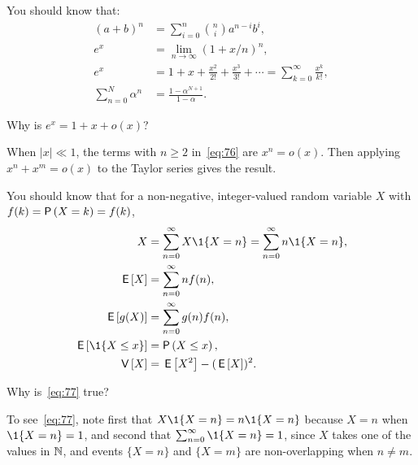 You should know that:
\begin{subequations}
 \begin{align}
 (a+b)^n &= \sum_{i=0}^n {n \choose i} a^{n-i} b^i, \label{eq:71}\\
e^x &= \lim_{n\to\infty} (1+x/n)^n, \label{eq:65}\\
 e^x &= 1 + x + \frac{x^2}{2!} + \frac{x^3}{3!} + \cdots = \sum_{k=0}^{\infty} \frac{x^k}{k!}, \label{eq:76}\\
 \sum_{n=0}^N \alpha^n &= \frac{1-\alpha^{N+1}}{1-\alpha}. \label{eq:61}
\end{align}
\end{subequations}

\begin{extra}
 Why is $e^{x} = 1 +x + o(x)$?
\begin{solution}
 When $|x|\ll 1$, the terms with $n\geq 2$ in~\cref{eq:76} are $x^n = o(x)$. Then applying $x^n + x^m = o(x)$ to the Taylor series gives the result.
\end{solution}
\end{extra}


You should know that for a non-negative, integer-valued random variable $X$ with  $f(k)= \P{X = k} = f(k)$, 
\begin{subequations}
\begin{align}
X&=\sum_{n=0}^\infty X\1{X=n} = \sum_{n=0}^\infty n \1{X=n}, \label{eq:77} \\
\E X &= \sum_{n=0}^\infty n f(n), \\
\E{g(X)} &= \sum_{n=0}^\infty g(n) f(n), \label{eq:66}\\
\E{\1{X\leq x}} &= \P{X\leq x}, \label{eq:74}\\
\V X &= \E{X^2} - (\E X)^2.\label{eq:68}
\end{align}
\end{subequations}

\begin{extra}
 Why is~\cref{eq:77} true?
\begin{solution}
To see~\cref{eq:77}, note first that $X\1{X=n} = n\1{X=n}$ because $X=n$ when $\1{X=n} =1$, and second that $\sum_{n=0}^\infty \1{X=n} =1$, since $X$ takes one of the values in $\mathbb{N}$, and events $\{X=n\}$ and $\{X=m\}$ are non-overlapping when $n\neq m$. 
\end{solution}
\end{extra}

